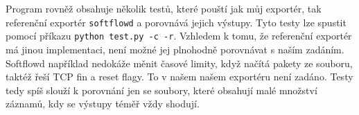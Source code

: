 \documentclass[a4paper, 11pt]{article}
\begin{document}
\begin{sloppypar}
\begin{lstlisting}[language=json, caption={Ukázka logu z kolektoru}, label={lst1}]
\end{lstlisting}


Program rovněž obsahuje několik testů, které pouští jak můj exportér, tak referenční exportér \texttt{softflowd} a porovnává jejich výstupy. Tyto testy lze spustit pomocí příkazu \texttt{python test.py -c -r}. Vzhledem k tomu, že referenční exportér má jinou implementaci, není možné jej plnohodně porovnávat s naším zadáním. Softflowd například nedokáže měnit časové limity, když načítá pakety ze souboru, taktéž řeší TCP fin a reset flagy. To v našem našem exportéru není zadáno. Testy tedy spíš slouží k porovnání jen se soubory, které obsahují malé množství záznamů, kdy se výstupy téměř vždy shodují.



\end{sloppypar}
\end{document}
